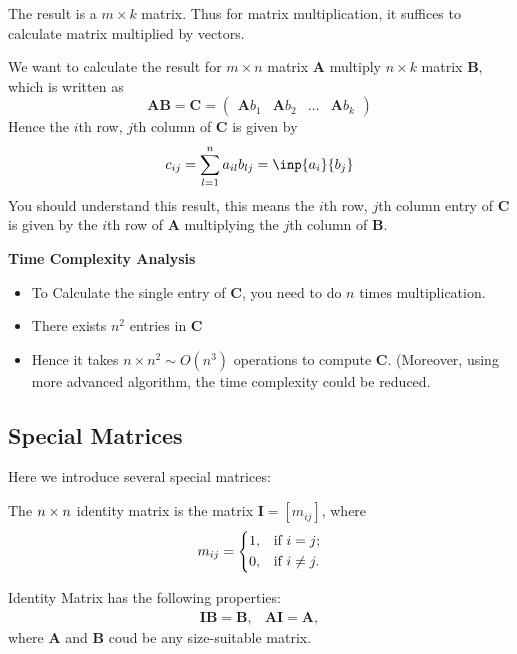 The result is a $m\times k$ matrix. Thus for matrix multiplication, it suffices to calculate matrix multiplied by vectors.
\begin{example}
We want to calculate the result for $m \times n$ matrix $\bm A$ multiply $n\times k$ matrix $\bm B$, which is written as 
\[\bm A\bm B = \bm C = \begin{pmatrix}
\bm Ab_1 &\bm Ab_2 & \dots & \bm Ab_k
\end{pmatrix}\]
Hence the $i$th row, $j$th column of $\bm C $ is given by
\[
c_{ij} = \sum_{l=1}^{n}a_{il}b_{lj} = \inp{a_i}{b_j}
\]
You should understand this result, this means the $i$th row, $j$th column entry of $\bm C $ is given by the $i$th row of $\bm A $ multiplying the $j$th column of $\bm B $.
\end{example}
\begin{remark}
\textbf{Time Complexity Analysis}
\begin{itemize}
\item
To Calculate the single entry of $\bm C$, you need to do $n$ times multiplication.
\item There exists $n^2$ entries in $\bm C$
\item
Hence it takes $n \times n^2 \sim O(n^3)$ operations to compute $\bm C$. (Moreover, using more advanced algorithm, the time complexity could be reduced.
\end{itemize}
\end{remark}

\subsection{Special Matrices}
Here we introduce several special matrices:
\begin{definition}
The $n \times n$ identity matrix is the matrix $\bm I = [m_{ij}]$, where 
\[
m_{ij} = \begin{dcases}
1, & \text{if } i =j; \\
0, & \text{if } i\ne j.
\end{dcases}
\]
\end{definition}
\begin{proposition}
Identity Matrix has the following properties:
\[
\begin{array}{ll}
\bm I \bm B = \bm B,&
\bm A \bm I = \bm A,
\end{array}
\]
where $\bm A$ and $\bm B$ coud be any size-suitable matrix.
\end{proposition}

